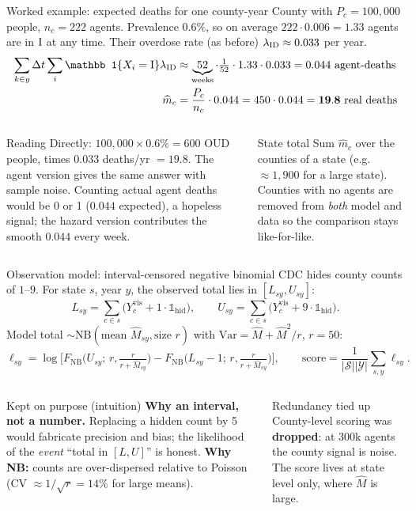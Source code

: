 ﻿\documentclass[9pt,aspectratio=169]{beamer}
\newenvironment{tied}{\begin{alertblock}{Redundancy tied up}\small}{\end{alertblock}}
\newenvironment{kept}{\begin{exampleblock}{Kept on purpose (intuition)}\small}{\end{exampleblock}}
\newcommand{\ind}{\mathbb 1}
\newcommand{\nbc}{F_{\mathrm{NB}}}
\begin{document}
\begin{frame}{Worked example: expected deaths for one county-year}
 County with $P_c=100{,}000$ people, $n_c=222$ agents. Prevalence $0.6\%$, so on average $222\cdot0.006=1.33$ agents are in $\mathrm{I}$ at any time. Their overdose rate (as before) $\lambda_{\mathrm{I}\mathrm{D}}\approx0.033$ per year.
 \begin{align*}
  \sum_{k\in y}\Delta t\sum_i\ind\{X_i=\Ic\}\lambda_{\Ic\Dc}&\approx\underbrace{52}_{\text{weeks}}\cdot\tfrac1{52}\cdot1.33\cdot0.033=0.044\ \text{agent-deaths}\\
  \widehat m_c&=\frac{P_c}{n_c}\cdot0.044=450\cdot0.044=\mathbf{19.8}\ \text{real deaths}
 \end{align*}
 \begin{columns}[T]
 \begin{block}{Reading}\small
  Directly: $100{,}000\times0.6\%=600$ OUD people, times $0.033$ deaths/yr $=19.8$. The agent version gives the same answer with sample noise. Counting actual agent deaths would be 0 or 1 ($0.044$ expected), a hopeless signal; the hazard version contributes the smooth $0.044$ every week.
 \end{block}
 \begin{block}{State total}\small
  Sum $\widehat m_c$ over the counties of a state (e.g.\ $\approx1{,}900$ for a large state). Counties with no agents are removed from \emph{both} model and data so the comparison stays like-for-like.
 \end{block}
 \end{columns}
\end{frame}

\begin{frame}{Observation model: interval-censored negative binomial}
 CDC hides county counts of $1$--$9$. For state $s$, year $y$, the observed total lies in $[L_{sy},U_{sy}]$:
 \[
  L_{sy}=\sum_{c\in s}\big(Y^{\mathrm{vis}}_c+1\cdot\ind_{\mathrm{hid}}\big),\qquad
  U_{sy}=\sum_{c\in s}\big(Y^{\mathrm{vis}}_c+9\cdot\ind_{\mathrm{hid}}\big).
 \]
 Model total $\sim\mathrm{NB}(\text{mean }\widehat M_{sy},\text{size }r)$ with $\mathrm{Var}=\widehat M+\widehat M^2/r$, $r=50$:
 \[
  \ell_{sy}=\log\Big[\nbc\big(U_{sy};\,r,\tfrac{r}{r+\widehat M_{sy}}\big)-\nbc\big(L_{sy}-1;\,r,\tfrac{r}{r+\widehat M_{sy}}\big)\Big],\qquad
  \mathrm{score}=\frac1{|\mathcal S||\mathcal Y|}\sum_{s,y}\ell_{sy}.
 \]
 \begin{columns}[T]
 \begin{kept}
  \textbf{Why an interval, not a number.} Replacing a hidden count by 5 would fabricate precision and bias; the likelihood of the \emph{event} ``total in $[L,U]$'' is honest. \textbf{Why NB:} counts are over-dispersed relative to Poisson (CV $\approx1/\sqrt r=14\%$ for large means).
 \end{kept}
 \begin{tied}
  County-level scoring was \textbf{dropped}: at 300k agents the county signal is noise. The score lives at state level only, where $\widehat M$ is large.
 \end{tied}
 \end{columns}
\end{frame}
\end{document}
